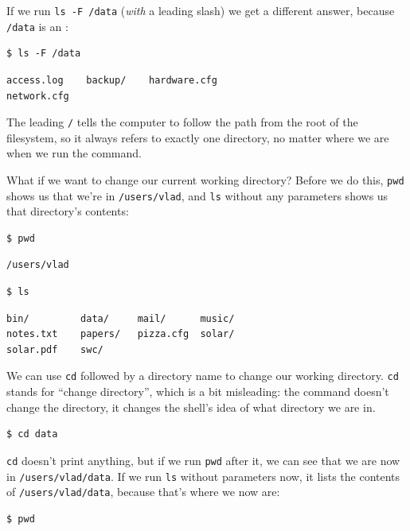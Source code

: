 \documentclass{book}
\begin{document}
If we run \texttt{ls -F /data} (\emph{with} a leading slash) we get a
different answer, because \texttt{/data} is an
:

\begin{verbatim}
$ ls -F /data
\end{verbatim}

\begin{verbatim}
access.log    backup/    hardware.cfg
network.cfg
\end{verbatim}

The leading \texttt{/} tells the computer to follow the path from the
root of the filesystem, so it always refers to exactly one directory, no
matter where we are when we run the command.

What if we want to change our current working directory? Before we do
this, \texttt{pwd} shows us that we're in \texttt{/users/vlad}, and
\texttt{ls} without any parameters shows us that directory's contents:

\begin{verbatim}
$ pwd
\end{verbatim}

\begin{verbatim}
/users/vlad
\end{verbatim}

\begin{verbatim}
$ ls
\end{verbatim}

\begin{verbatim}
bin/         data/     mail/      music/
notes.txt    papers/   pizza.cfg  solar/
solar.pdf    swc/
\end{verbatim}

We can use \texttt{cd} followed by a directory name to change our
working directory. \texttt{cd} stands for ``change directory'', which is
a bit misleading: the command doesn't change the directory, it changes
the shell's idea of what directory we are in.

\begin{verbatim}
$ cd data
\end{verbatim}

\texttt{cd} doesn't print anything, but if we run \texttt{pwd} after it,
we can see that we are now in \texttt{/users/vlad/data}. If we run
\texttt{ls} without parameters now, it lists the contents of
\texttt{/users/vlad/data}, because that's where we now are:

\begin{verbatim}
$ pwd
\end{verbatim}
\end{document}
